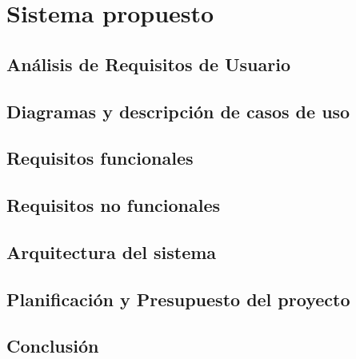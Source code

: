 \section{Sistema propuesto}

\subsection{Análisis de Requisitos de Usuario}

\subsection{Diagramas y descripción de casos de uso}

\subsection{Requisitos funcionales}

\subsection{Requisitos no funcionales}

\subsection{Arquitectura del sistema}

\subsection{Planificación y Presupuesto del proyecto}

\subsection{Conclusión}

\newpage